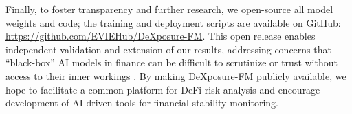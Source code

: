 Finally, to foster transparency and further research, we open-source all model weights and code; the training and deployment scripts are available on GitHub: {\url{https://github.com/EVIEHub/DeXposure-FM}}. This open release enables independent validation and extension of our results, addressing concerns that “black-box” AI models in finance can be difficult to scrutinize or trust without access to their inner workings \cite{FSB2024AI}. By making DeXposure-FM publicly available, we hope to facilitate a common platform for DeFi risk analysis and encourage development of AI-driven tools for financial stability monitoring.

